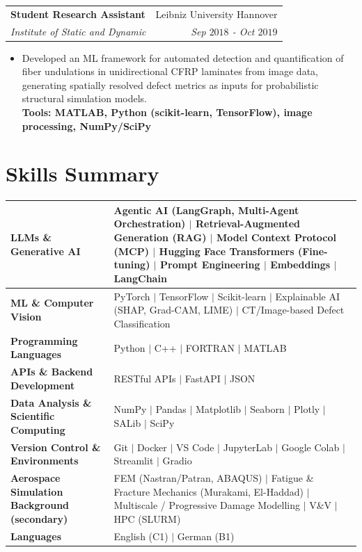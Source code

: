 \documentclass[a4paper,20pt]{article}
\makeatletter
\newcommand{\resumeSubheading}[4]{
  \vspace{-1pt}\item
    \begin{tabular*}{0.97\textwidth}{l@{\extracolsep{\fill}}r}
      \textbf{#1} & #2 \\
      \textit{#3} & \textit{#4} \\
    \end{tabular*}\vspace{-5pt}
}
\newcommand{\resumeItemListStart}{\begin{itemize}}
\newcommand{\resumeItemListEnd}{\end{itemize}\vspace{-5pt}}
\makeatother
\begin{document}
    \vspace{10pt}

\resumeSubheading
    {Student Research Assistant}{Leibniz University Hannover}
    {Institute of Static and Dynamic}{Sep $2018$ - Oct $2019$}
    \resumeItemListStart

    \item Developed an ML framework for automated detection and quantification of fiber undulations in unidirectional CFRP laminates from image data, generating spatially resolved defect metrics as inputs for probabilistic structural simulation models.
    \\
    \textbf{Tools: MATLAB, Python (scikit-learn, TensorFlow), image processing, NumPy/SciPy}

    \resumeItemListEnd

\renewcommand{\arraystretch}{1.3}
\section{\color{blue}Skills Summary}
\begin{tabular}{|p{8cm}p{10.5cm}|}

\hline
\textbf{LLMs \& Generative AI} &
Agentic AI (LangGraph, Multi-Agent Orchestration) \(\vert\) Retrieval-Augmented Generation (RAG) \(\vert\) Model Context Protocol (MCP) \(\vert\) Hugging Face Transformers (Fine-tuning) \(\vert\) Prompt Engineering \(\vert\) Embeddings \(\vert\) LangChain \\
\hline

\textbf{ML \& Computer Vision} &
PyTorch \(\vert\) TensorFlow \(\vert\) Scikit-learn \(\vert\) Explainable AI (SHAP, Grad-CAM, LIME) \(\vert\) CT/Image-based Defect Classification \\
\hline

\textbf{Programming Languages} &
Python \(\vert\) C++ \(\vert\) FORTRAN \(\vert\) MATLAB \\
\hline

\textbf{APIs \& Backend Development} &
RESTful APIs \(\vert\) FastAPI \(\vert\) JSON \\
\hline

\textbf{Data Analysis \& Scientific Computing} &
NumPy \(\vert\) Pandas \(\vert\) Matplotlib \(\vert\) Seaborn \(\vert\) Plotly \(\vert\) SALib \(\vert\) SciPy \\
\hline

\textbf{Version Control \& Environments} &
Git \(\vert\) Docker \(\vert\) VS Code \(\vert\) JupyterLab \(\vert\) Google Colab \(\vert\) Streamlit \(\vert\) Gradio \\
\hline

\textbf{Aerospace Simulation Background (secondary)} &
FEM (Nastran/Patran, ABAQUS) \(\vert\) Fatigue \& Fracture Mechanics (Murakami, El-Haddad) \(\vert\) Multiscale / Progressive Damage Modelling \(\vert\) V\&V \(\vert\) HPC (SLURM) \\
\hline

\textbf{Languages} &
English (C1) \(\vert\) German (B1) \\
\hline
\end{tabular}
\end{document}
